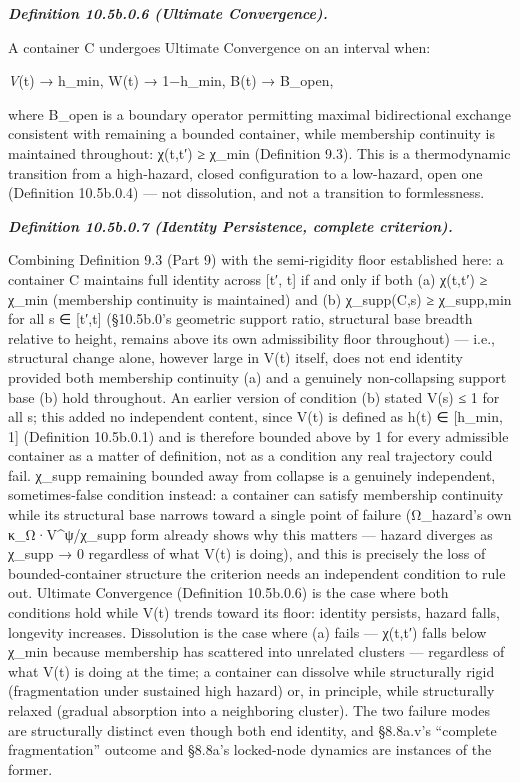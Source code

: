 \documentclass[
]{article}
\begin{document}
\emph{\textbf{Definition 10.5b.0.6 (Ultimate Convergence).}}

A container C undergoes Ultimate Convergence on an interval when:

\emph{V}(t) → h\_min, W(t) → 1−h\_min, B(t) → B\_open,

where B\_open is a boundary operator permitting maximal bidirectional
exchange consistent with remaining a bounded container, while membership
continuity is maintained throughout: χ(t,t′) ≥ χ\_min (Definition 9.3).
This is a thermodynamic transition from a high-hazard, closed
configuration to a low-hazard, open one (Definition 10.5b.0.4) --- not
dissolution, and not a transition to formlessness.

\emph{\textbf{Definition 10.5b.0.7 (Identity Persistence, complete
criterion).}}

Combining Definition 9.3 (Part 9) with the semi-rigidity floor
established here: a container C maintains full identity across {[}t′,
t{]} if and only if both (a) χ(t,t′) ≥ χ\_min (membership continuity is
maintained) and (b) χ\_supp(C,s) ≥ χ\_supp,min for all s ∈ {[}t′,t{]}
(§10.5b.0's geometric support ratio, structural base breadth relative to
height, remains above its own admissibility floor throughout) --- i.e.,
structural change alone, however large in V(t) itself, does not end
identity provided both membership continuity (a) and a genuinely
non-collapsing support base (b) hold throughout. An earlier version of
condition (b) stated V(s) ≤ 1 for all s; this added no independent
content, since V(t) is defined as h(t) ∈ {[}h\_min, 1{]} (Definition
10.5b.0.1) and is therefore bounded above by 1 for every admissible
container as a matter of definition, not as a condition any real
trajectory could fail. χ\_supp remaining bounded away from collapse is a
genuinely independent, sometimes-false condition instead: a container
can satisfy membership continuity while its structural base narrows
toward a single point of failure (Ω\_hazard's own κ\_Ω·V\^{}ψ/χ\_supp
form already shows why this matters --- hazard diverges as χ\_supp → 0
regardless of what V(t) is doing), and this is precisely the loss of
bounded-container structure the criterion needs an independent condition
to rule out. Ultimate Convergence (Definition 10.5b.0.6) is the case
where both conditions hold while V(t) trends toward its floor: identity
persists, hazard falls, longevity increases. Dissolution is the case
where (a) fails --- χ(t,t′) falls below χ\_min because membership has
scattered into unrelated clusters --- regardless of what V(t) is doing
at the time; a container can dissolve while structurally rigid
(fragmentation under sustained high hazard) or, in principle, while
structurally relaxed (gradual absorption into a neighboring cluster).
The two failure modes are structurally distinct even though both end
identity, and §8.8a.v's ``complete fragmentation'' outcome and §8.8a's
locked-node dynamics are instances of the former.
\end{document}

